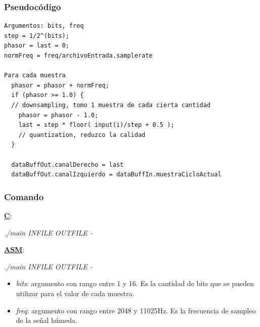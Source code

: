 \subsubsection{Pseudocódigo}
\label{subsec:desarrollo-bitcrusher-code}

\lstset{language=C}
\begin{lstlisting}[frame=single]
Argumentos: bits, freq
step = 1/2^(bits);
phasor = last = 0;
normFreq = freq/archivoEntrada.samplerate

Para cada muestra
  phasor = phasor + normFreq;
  if (phasor >= 1.0) { 	
  // downsampling, tomo 1 muestra de cada cierta cantidad
    phasor = phasor - 1.0; 
    last = step * floor( input(i)/step + 0.5 );
    // quantization, reduzco la calidad 
  }

  dataBuffOut.canalDerecho = last
  dataBuffOut.canalIzquierdo = dataBuffIn.muestraCicloActual

\end{lstlisting}

\subsubsection{Comando}
\label{subsec:desarrollo-bitcrusher-call}

\underline{\textbf{C}}:
\begin{center}
 \textit{./main INFILE OUTFILE -}
\end{center}

\underline{\textbf{ASM}}:
\begin{center}
 \textit{./main INFILE OUTFILE -}
\end{center}

\begin{itemize}
 \item \textit{bits}: argumento con rango entre 1 y 16. Es la cantidad de bits que se pueden utilizar para el valor de cada muestra.
 \item \textit{freq}: argumento con rango entre 2048 y 11025Hz. Es la frecuencia de sampleo de la señal húmeda.
\end{itemize}
 
 
